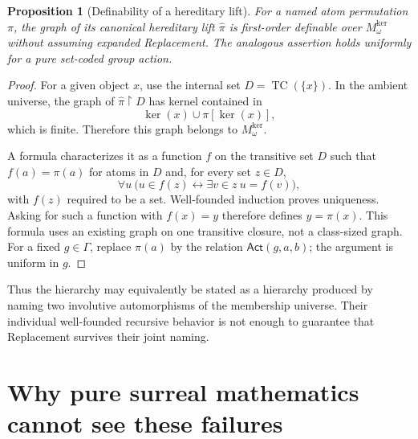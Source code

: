 \documentclass[11pt,letterpaper]{article}
\newtheorem{proposition}[proposition]{Proposition}\aliascntresetthe{proposition}
\theoremstyle{definition}
\theoremstyle{remark}
\newcommand{\TC}{\operatorname{TC}}
\newcommand{\kerat}{\operatorname{ker}}
\newcommand{\Mker}{M^{\mathrm{ker}}}
\newcommand{\restr}{\mathbin{\upharpoonright}}
\newcommand{\Act}{\mathsf{Act}}
\begin{document}
\begin{proposition}[Definability of a hereditary lift]\label{hset:ns:prop:lift}
For a named atom permutation $\pi$, the graph of its canonical hereditary lift $\widehat\pi$ is first-order definable over $\Mker_\omega$ without assuming expanded Replacement. The analogous assertion holds uniformly for a pure set-coded group action.
\end{proposition}
\begin{proof}
For a given object $x$, use the internal set $D=\TC(\{x\})$. In the ambient universe, the graph of $\widehat\pi\restr D$ has kernel contained in
\[
 \kerat(x)\cup\pi[\kerat(x)],
\]
which is finite. Therefore this graph belongs to $\Mker_\omega$.

A formula characterizes it as a function $f$ on the transitive set $D$ such that $f(a)=\pi(a)$ for atoms in $D$ and, for every set $z\in D$,
\[
 \forall u\ \bigl(u\in f(z)\leftrightarrow\exists v\in z\ u=f(v)\bigr),
\]
with $f(z)$ required to be a set. Well-founded induction proves uniqueness. Asking for such a function with $f(x)=y$ therefore defines $y=\widehat\pi(x)$. This formula uses an existing graph on one transitive closure, not a class-sized graph. For a fixed $g\in\Gamma$, replace $\pi(a)$ by the relation $\Act(g,a,b)$; the argument is uniform in $g$.
\end{proof}
Thus the hierarchy may equivalently be stated as a hierarchy produced by naming two involutive automorphisms of the membership universe. Their individual well-founded recursive behavior is not enough to guarantee that Replacement survives their joint naming.

\section{Why pure surreal mathematics cannot see these failures}
\label{hset:ns:sec:surreal}
\end{document}

